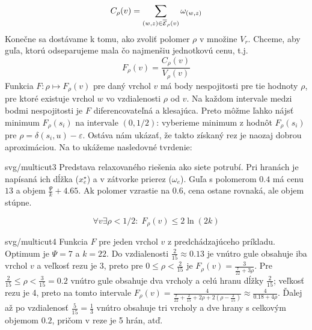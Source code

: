 \noindent
\begin{minipage}[t]{0.5\textwidth-1cm}
\noindent
$$C_\rho(v)=\sum_{(w,z)\in\overline{\cal E}_\rho(v)}\omega_{(w,z)}$$
Konečne sa dostávame k tomu, ako zvoliť polomer $\rho$ v množine $V_r$. Chceme, aby guľa, ktorú odseparujeme mala čo 
najmenšiu jednotkovú cenu, t.j.
$$F_\rho(v)=\frac{C_\rho(v)}{V_\rho(v)}$$
Funkcia $F:\rho\mapsto F_\rho(v)$ pre daný vrchol $v$ má body nespojitosti pre tie hodnoty $\rho$, pre ktoré
existuje vrchol $w$ vo vzdialenosti $\rho$ od $v$. Na každom intervale medzi bodmi nespojitosti je $F$ diferencovateľná
a klesajúca.
Preto môžme ľahko nájsť minimum $F_\rho(s_i)$ na intervale $(0,1/2)$: vyberieme minimum z hodnôt 
$F_\rho(s_i)$ pre $\rho=\delta(s_i,u)-\varepsilon$.
Ostáva nám ukázať, že takto získaný rez je naozaj dobrou aproximáciou. Na to ukážeme nasledovné tvrdenie:
\end{minipage}\hspace*{1cm}\begin{minipage}[t]{0.5\textwidth}
\begin{myfig}{0.7\textwidth}{svg/multicut3}
  Predstava relaxovaného riešenia ako siete potrubí. Pri hranách je napísaná ich dĺžka ($x_e^\star$) a v zátvorke 
  prierez ($\omega_e$). 
  Guľa s polomerom $0.4$ má cenu $13$ a objem $\frac{\Psi}{k}+4.65$. Ak polomer vzrastie na $0.6$, cena ostane rovnaká,
  ale objem stúpne.
\end{myfig}
\end{minipage}
\noindent
\begin{equation}
\label{eq:cut1}
\forall v\exists\rho<1/2:\;F_\rho(v)\le2\ln(2k)
\end{equation}

\begin{myfig}{\textwidth}{svg/multicut4}
  Funkcia $F$ pre jeden vrchol $v$ z predchádzajúceho príkladu. Optimum je $\Psi=7$ a $k=22$.
  Do vzdialenosti $\frac{2}{15}\approx 0.13$ je vnútro gule obsahuje iba vrchol $v$ a veľkosť rezu
  je 3, preto pre $0\le\rho<\frac{2}{15}$ je $F_\rho(v)=\frac{3}{\frac{7}{22}+3\rho}$.
  Pre $\frac{2}{15}\le\rho<\frac{3}{15}=0.2$ vnútro gule obsahuje dva vrcholy a celú hranu dĺžky $\frac{2}{15}$;
  veľkosť rezu je 4, preto na tomto intervale $F_\rho(v)=\frac{4}{\frac{7}{22}+\frac{2}{15}+2\rho+2(\rho-\frac{2}{15})}
  \approx\frac{4}{0.18+4\rho}$. Ďalej až po vzdialenosť $\frac{5}{15}=\frac{1}{3}$ 
  vnútro obsahuje tri vrcholy a dve hrany s celkovým objemom $0.2$, pričom v reze je 5 hrán, atď.
\end{myfig}

